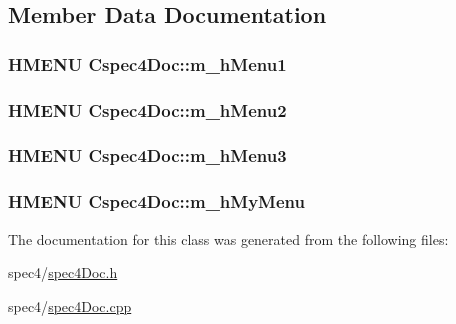 \subsection{Member Data Documentation}
\hypertarget{classCspec4Doc_ad1aadefc63e840d5e456e47542066a86}{
\subsubsection[{m\_\-hMenu1}]{\setlength{\rightskip}{0pt plus 5cm}HMENU {\bf Cspec4Doc::m\_\-hMenu1}}}
\label{classCspec4Doc_ad1aadefc63e840d5e456e47542066a86}
\hypertarget{classCspec4Doc_ad7b26f7b7abdcfef3890d1dd178885f2}{
\subsubsection[{m\_\-hMenu2}]{\setlength{\rightskip}{0pt plus 5cm}HMENU {\bf Cspec4Doc::m\_\-hMenu2}}}
\label{classCspec4Doc_ad7b26f7b7abdcfef3890d1dd178885f2}
\hypertarget{classCspec4Doc_ab80ce81fc7bafe5ecfc0e3e971b6ec7c}{
\subsubsection[{m\_\-hMenu3}]{\setlength{\rightskip}{0pt plus 5cm}HMENU {\bf Cspec4Doc::m\_\-hMenu3}}}
\label{classCspec4Doc_ab80ce81fc7bafe5ecfc0e3e971b6ec7c}
\hypertarget{classCspec4Doc_a1c22de6ba161ce480dda949516bf72f9}{
\subsubsection[{m\_\-hMyMenu}]{\setlength{\rightskip}{0pt plus 5cm}HMENU {\bf Cspec4Doc::m\_\-hMyMenu}}}
\label{classCspec4Doc_a1c22de6ba161ce480dda949516bf72f9}


The documentation for this class was generated from the following files:\begin{DoxyCompactItemize}
\item 
spec4/\hyperlink{spec4Doc_8h}{spec4Doc.h}\item 
spec4/\hyperlink{spec4Doc_8cpp}{spec4Doc.cpp}\end{DoxyCompactItemize}
